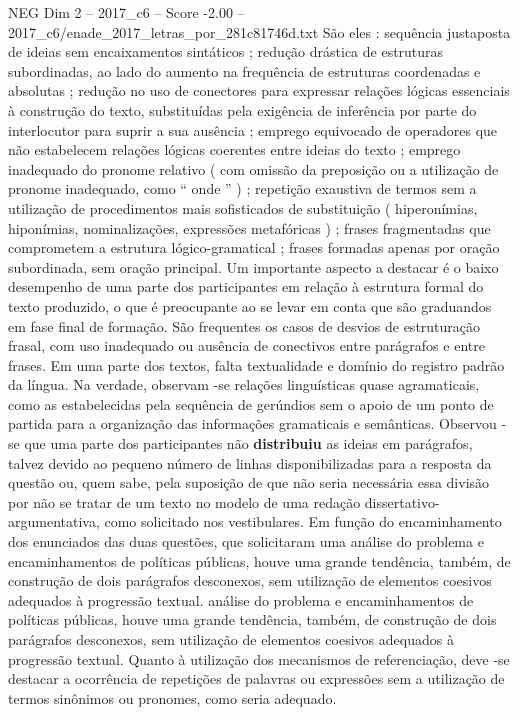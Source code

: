 \begin{textsample}{NEG Dim 2 – 2017\_c6 – Score -2.00 – 2017\_c6/enade\_2017\_letras\_por\_281c81746d.txt}
São eles : sequência justaposta de ideias sem encaixamentos sintáticos ; redução drástica de estruturas subordinadas, ao lado do aumento na frequência de estruturas coordenadas e absolutas ; redução no uso de conectores para expressar relações lógicas essenciais à construção do texto, substituídas pela exigência de inferência por parte do interlocutor para suprir a sua ausência ; emprego equivocado de operadores que não estabelecem relações lógicas coerentes entre ideias do texto ; emprego inadequado do pronome relativo ( com omissão da preposição ou a utilização de pronome inadequado, como “ onde ” ) ; repetição exaustiva de termos sem a utilização de procedimentos mais sofisticados de substituição ( hiperonímias, hiponímias, nominalizações, expressões metafóricas ) ; frases fragmentadas que comprometem a estrutura lógico-gramatical ; frases formadas apenas por oração subordinada, sem oração principal.
Um importante aspecto a destacar é o baixo desempenho de uma parte dos participantes em relação à estrutura formal do texto produzido, o que é preocupante ao se levar em conta que são graduandos em fase final de formação.
São frequentes os casos de desvios de estruturação frasal, com uso inadequado ou ausência de conectivos entre parágrafos e entre frases.
Em uma parte dos textos, falta textualidade e domínio do registro padrão da língua.
Na verdade, observam -se relações linguísticas quase agramaticais, como as estabelecidas pela sequência de gerúndios sem o apoio de um ponto de partida para a organização das informações gramaticais e semânticas.
Observou -se que uma parte dos participantes não \textbf{distribuiu} as ideias em parágrafos, talvez devido ao pequeno número de linhas disponibilizadas para a resposta da questão ou, quem sabe, pela suposição de que não seria necessária essa divisão por não se tratar de um texto no modelo de uma redação dissertativo-argumentativa, como solicitado nos vestibulares.
Em função do encaminhamento dos enunciados das duas questões, que solicitaram uma análise do problema e encaminhamentos de políticas públicas, houve uma grande tendência, também, de construção de dois parágrafos desconexos, sem utilização de elementos coesivos adequados à progressão textual. análise do problema e encaminhamentos de políticas públicas, houve uma grande tendência, também, de construção de dois parágrafos desconexos, sem utilização de elementos coesivos adequados à progressão textual.
Quanto à utilização dos mecanismos de referenciação, deve -se destacar a ocorrência de repetições de palavras ou expressões sem a utilização de termos sinônimos ou pronomes, como seria adequado.

\end{textsample}
